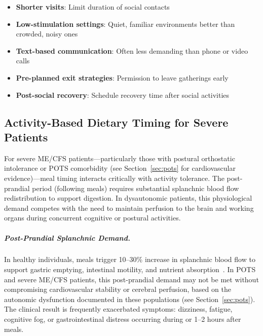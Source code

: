 \begin{itemize}
    \item \textbf{Shorter visits}: Limit duration of social contacts
    \item \textbf{Low-stimulation settings}: Quiet, familiar environments better than crowded, noisy ones
    \item \textbf{Text-based communication}: Often less demanding than phone or video calls
    \item \textbf{Pre-planned exit strategies}: Permission to leave gatherings early
    \item \textbf{Post-social recovery}: Schedule recovery time after social activities
\end{itemize}

\subsection{Activity-Based Dietary Timing for Severe Patients}

For severe ME/CFS patients---particularly those with postural orthostatic intolerance or POTS comorbidity (see Section~\ref{sec:pots} for cardiovascular evidence)---meal timing interacts critically with activity tolerance. The post-prandial period (following meals) requires substantial splanchnic blood flow redistribution to support digestion. In dysautonomic patients, this physiological demand competes with the need to maintain perfusion to the brain and working organs during concurrent cognitive or postural activities.

\subparagraph{Post-Prandial Splanchnic Demand.}
In healthy individuals, meals trigger 10--30\% increase in splanchnic blood flow to support gastric emptying, intestinal motility, and nutrient absorption~\cite{terSteege2012}. In POTS and severe ME/CFS patients, this post-prandial demand may not be met without compromising cardiovascular stability or cerebral perfusion, based on the autonomic dysfunction documented in these populations (see Section~\ref{sec:pots}). The clinical result is frequently exacerbated symptoms: dizziness, fatigue, cognitive fog, or gastrointestinal distress occurring during or 1--2 hours after meals.

